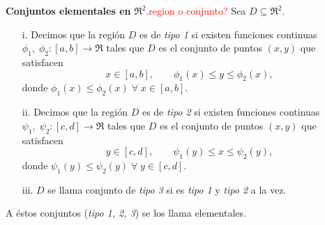 \begin{definition}\textbf{Conjuntos elementales en }$\Re^2$.\textcolor{red}{region o conjunto?}
    Sea $D\subseteq\Re^2$.
    \begin{enumerate}
    \item[i.]
    Decimos que la regi\'on $D$ es de \textit{tipo 1} si existen funciones continuas $\phi_1,\;\phi_2:[a,b]\to\Re$ tales que $D$ es el conjunto de puntos $(x,y)$ que satisfacen
    \[
        x\in[a,b], \qquad \phi_1(x)\leq y\leq\phi_2(x),  
    \]%
    donde $\phi_1(x)\leq\phi_2(x)\;\forall\;x\in[a,b].$
    \item[ii.]
    Decimos que la regi\'on $D$ es de \textit{tipo 2} si existen funciones continuas $\psi_1,\;\psi_2:[c,d]\to\Re$ tales que $D$ es el conjunto de puntos $(x,y)$ que satisfacen
    \[
        y\in[c,d], \qquad \psi_1(y)\leq x\leq\psi_2(y),  
    \]
    donde $\psi_1(y)\leq\psi_2(y)\;\forall\;y\in[c,d].$
    \item[iii.]
    $D$ se llama conjunto de \textit{tipo 3} si es \textit{tipo 1} y \textit{tipo 2} a la vez.
    \end{enumerate}
    A \'estos conjuntos (\textit{tipo 1, 2, 3}) se los llama elementales.
\end{definition}

